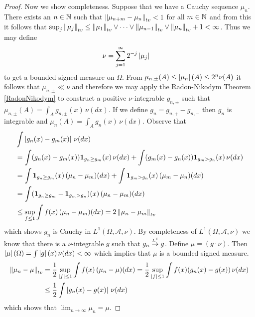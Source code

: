 \begin{proof}
Now we show completeness.  Suppose that we have a Cauchy sequence $\mu_n$.  There exists an $n \in \mathbb{N}$ such that $\left \lVert  \mu_{n+m} - \mu_n \right \rVert_{tv} < 1$ for all $m \in \mathbb{N}$ and from this it follows that $\sup_j \left \lVert  \mu_j \right \rVert_{tv} \leq \left \lVert  \mu_1 \right \rVert_{tv} \vee \dotsb \vee \left \lVert  \mu_{n-1} \right \rVert_{tv} \vee \left \lVert  \mu_n \right \rVert_{tv}+1  <\infty$.  Thus we may define
\begin{align*}
\nu &= \sum_{j=1}^\infty 2^{-j} \left \vert \mu_j \right \vert
\end{align*}
to get a bounded signed measure on $\Omega$.  From $\mu_{n, \pm}(A) \leq \left \vert \mu_n \right \vert(A) \leq 2^n \nu(A)$ it follows that $\mu_{n, \pm} \ll \nu$ and therefore we may apply the Radon-Nikodym Theorem \ref{RadonNikodym} to construct
a positive $\nu$-integrable $g_{n,\pm}$ such that $\mu_{n, \pm}(A) = \int_A g_{n,\pm}(x) \, \nu(dx)$.  If we define $g_n = g_{n,+} - g_{n,-}$ then $g_n$ is integrable and $\mu_{n}(A) = \int_A g_{n}(x) \, \nu(dx)$.   Observe that 
\begin{align*}
&\int \left \vert g_n(x) - g_m(x) \right \vert \, \nu(dx) \\
&= \int (g_n(x) - g_m(x)) \textbf{1}_{g_n\geq g_m}(x) \, \nu(dx) + \int (g_m(x) - g_n(x)) \textbf{1}_{g_m > g_n}(x) \, \nu(dx) \\
&= \int \textbf{1}_{g_n\geq g_m}(x) \, (\mu_n - \mu_m) (dx) + \int \textbf{1}_{g_m > g_n}(x) \, (\mu_m - \mu_n) (dx) \\
&= \int (\textbf{1}_{g_n\geq g_m} - \textbf{1}_{g_m > g_n}) (x) \, (\mu_n - \mu_m) (dx) \\
&\leq \sup_{f \leq 1} \int f(x) \, (\mu_n-\mu_m)(dx) = 2 \left \lVert  \mu_n - \mu_m \right \rVert_{tv} \\
\end{align*}
which shows $g_n$ is Cauchy in $L^1(\Omega, \mathcal{A}, \nu)$.  By completeness of $L^1(\Omega, \mathcal{A}, \nu)$ we know that there is a $\nu$-integrable $g$ such that $g_n \overset{L^1}\to g$.  Define 
$\mu = (g \cdot \nu)$.  Then $\left \vert \mu \right \vert(\Omega) = \int \left \vert g \right \vert(x) \, \nu(dx) < \infty$ which implies that $\mu$ is a bounded signed measure.
\begin{align*}
\left \lVert  \mu_n - \mu \right \rVert_{tv} &= \frac{1}{2} \sup_{\left \vert f \right \vert \leq 1} \int f(x) \, (\mu_n - \mu)(dx) = \frac{1}{2} \sup_{\left \vert f \right \vert \leq 1} \int f(x) (g_n(x) - g(x)) \, \nu(dx) \\
&\leq \frac{1}{2} \int \left \vert g_n(x) - g(x) \right \vert \, \nu(dx)
\end{align*}
which shows that $\lim_{n \to \infty} \mu_n = \mu$.
\end{proof}



